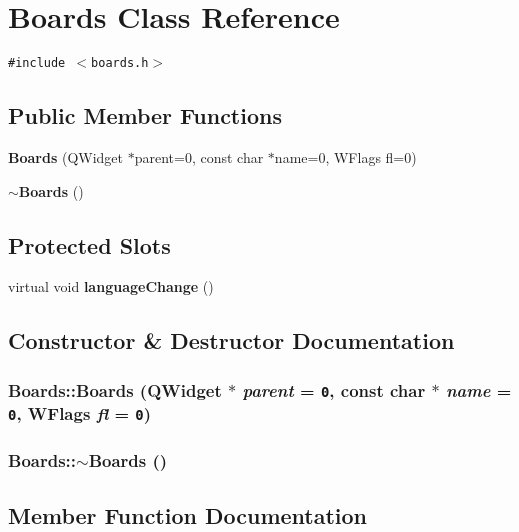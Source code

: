 \section{Boards Class Reference}
\label{classBoards}
{\tt \#include $<$boards.h$>$}

\subsection*{Public Member Functions}
\begin{CompactItemize}
\item 
{\bf Boards} (QWidget $\ast$parent=0, const char $\ast$name=0, WFlags fl=0)
\item 
{\bf $\sim$Boards} ()
\end{CompactItemize}
\subsection*{Protected Slots}
\begin{CompactItemize}
\item 
virtual void {\bf language\-Change} ()
\end{CompactItemize}


\subsection{Constructor \& Destructor Documentation}
\subsubsection{\setlength{\rightskip}{0pt plus 5cm}Boards::Boards (QWidget $\ast$ {\em parent} = {\tt 0}, const char $\ast$ {\em name} = {\tt 0}, WFlags {\em fl} = {\tt 0})}\label{classBoards_895173986a5ec17b90998f6a0d8001ee}


\subsubsection{\setlength{\rightskip}{0pt plus 5cm}Boards::$\sim$Boards ()}\label{classBoards_8abf9e2054c479033cad4d7fe7400c89}




\subsection{Member Function Documentation}
